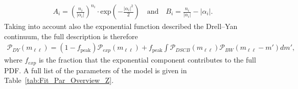 \begin{eqnarray*}
A_{i} = \left(\frac{n_{i}}{|\alpha_{i}|}\right)^{n_{i}} \cdot \textrm{exp}\left(-\frac{|\alpha_{i}|^2}{2}\right) \quad \textrm{and}\quad B_{i} = \frac{n_{i}}{|\alpha_{i}|}-|\alpha_{i}| .
\end{eqnarray*}
Taking into account also the exponential function described the Drell--Yan continuum, the full description is therefore 
\begin{eqnarray*}
\mathcal{P}_{DY} (m_{\ell\ell}) = (1-f_\text{peak})\mathcal{P}_{exp}(m_{\ell\ell})+ f_\text{peak}\int \mathcal{P}_{DSCB}(m_{\ell\ell})\mathcal{P}_{BW}(m_{\ell\ell}-m') dm',
\end{eqnarray*}
where $f_{exp}$ is the fraction that the exponential component contributes to the full PDF. A full list of the parameters of the model is given in Table~\ref{tab:Fit_Par_Overview_Z}.


